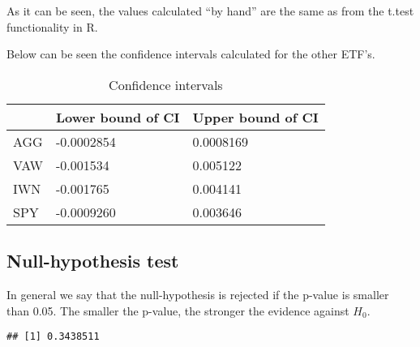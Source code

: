 \documentclass[
]{article}
\newenvironment{Shaded}{\begin{snugshade}}{\end{snugshade}}
\newcommand{\AttributeTok}[1]{\textcolor[rgb]{0.77,0.63,0.00}{#1}}
\newcommand{\CommentTok}[1]{\textcolor[rgb]{0.56,0.35,0.01}{\textit{#1}}}
\newcommand{\DecValTok}[1]{\textcolor[rgb]{0.00,0.00,0.81}{#1}}
\newcommand{\FunctionTok}[1]{\textcolor[rgb]{0.00,0.00,0.00}{#1}}
\newcommand{\NormalTok}[1]{#1}
\newcommand{\OtherTok}[1]{\textcolor[rgb]{0.56,0.35,0.01}{#1}}
\newcommand{\SpecialCharTok}[1]{\textcolor[rgb]{0.00,0.00,0.00}{#1}}
\begin{document}
As it can be seen, the values calculated ``by hand'' are the same as
from the t.test functionality in R.

Below can be seen the confidence intervals calculated for the other
ETF's.

\begin{table}[]
  \begin{center}
    \begin{tabular}{|l|l|l|}
    \hline
          & Lower bound of CI & Upper bound of CI \\ \hline
      AGG & -0.0002854        & 0.0008169         \\ \hline
      VAW & -0.001534         & 0.005122          \\ \hline
      IWN & -0.001765         & 0.004141          \\ \hline
      SPY & -0.0009260        & 0.003646          \\ \hline
    \end{tabular}
  \end{center}
  \caption{Confidence intervals}
\end{table}

\subsection{Null-hypothesis test}

In general we say that the null-hypothesis is rejected if the p-value is
smaller than 0.05. The smaller the p-value, the stronger the evidence
against \(H_0\).

\begin{Shaded}
\end{Shaded}

\begin{verbatim}
## [1] 0.3438511
\end{verbatim}
\end{document}
